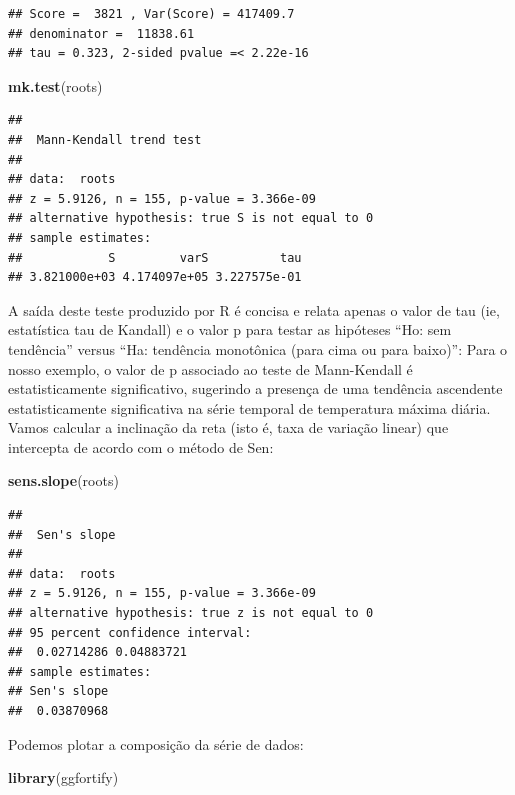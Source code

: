 \documentclass[
]{book}
\newenvironment{Shaded}{\begin{snugshade}}{\end{snugshade}}
\newcommand{\KeywordTok}[1]{\textcolor[rgb]{0.13,0.29,0.53}{\textbf{#1}}}
\newcommand{\NormalTok}[1]{#1}
\begin{document}
\begin{verbatim}
## Score =  3821 , Var(Score) = 417409.7
## denominator =  11838.61
## tau = 0.323, 2-sided pvalue =< 2.22e-16
\end{verbatim}

\begin{Shaded}
\begin{Highlighting}[]
\KeywordTok{mk.test}\NormalTok{(roots)}
\end{Highlighting}
\end{Shaded}

\begin{verbatim}
## 
##  Mann-Kendall trend test
## 
## data:  roots
## z = 5.9126, n = 155, p-value = 3.366e-09
## alternative hypothesis: true S is not equal to 0
## sample estimates:
##            S         varS          tau 
## 3.821000e+03 4.174097e+05 3.227575e-01
\end{verbatim}

A saída deste teste produzido por R é concisa e relata apenas o valor de tau (ie, estatística tau de Kandall) e o valor p para testar as hipóteses
``Ho: sem tendência'' versus ``Ha: tendência monotônica (para cima ou para baixo)'':
Para o nosso exemplo, o valor de p associado ao teste de Mann-Kendall é estatisticamente significativo, sugerindo a presença de uma tendência ascendente estatisticamente significativa na série temporal de temperatura máxima diária.
Vamos calcular a inclinação da reta (isto é, taxa de variação linear) que intercepta de acordo com o método de Sen:

\begin{Shaded}
\begin{Highlighting}[]
\KeywordTok{sens.slope}\NormalTok{(roots)}
\end{Highlighting}
\end{Shaded}

\begin{verbatim}
## 
##  Sen's slope
## 
## data:  roots
## z = 5.9126, n = 155, p-value = 3.366e-09
## alternative hypothesis: true z is not equal to 0
## 95 percent confidence interval:
##  0.02714286 0.04883721
## sample estimates:
## Sen's slope 
##  0.03870968
\end{verbatim}

Podemos plotar a composição da série de dados:

\begin{Shaded}
\begin{Highlighting}[]
\KeywordTok{library}\NormalTok{(ggfortify)}
\end{Highlighting}
\end{Shaded}
\end{document}
